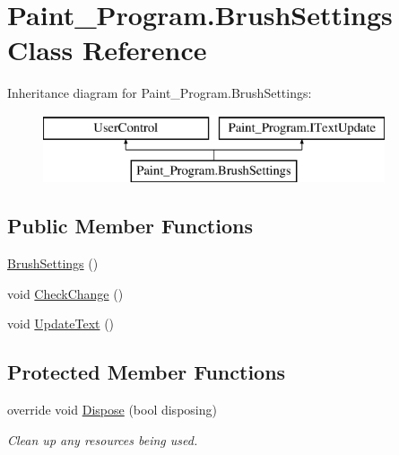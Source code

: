 \hypertarget{class_paint___program_1_1_brush_settings}{}\section{Paint\+\_\+\+Program.\+Brush\+Settings Class Reference}
\label{class_paint___program_1_1_brush_settings}
Inheritance diagram for Paint\+\_\+\+Program.\+Brush\+Settings\+:\begin{figure}[H]
\begin{center}
\leavevmode
\includegraphics[height=2.000000cm]{class_paint___program_1_1_brush_settings}
\end{center}
\end{figure}
\subsection*{Public Member Functions}
\begin{DoxyCompactItemize}
\item 
\mbox{\hyperlink{class_paint___program_1_1_brush_settings_a70080ac2deafd89e2181a30fff984c2d}{Brush\+Settings}} ()
\item 
void \mbox{\hyperlink{class_paint___program_1_1_brush_settings_aca47f3fee40766ced37ffc395b63cde0}{Check\+Change}} ()
\item 
void \mbox{\hyperlink{class_paint___program_1_1_brush_settings_a0669e5f09b62b9545e408f39689f30ed}{Update\+Text}} ()
\end{DoxyCompactItemize}
\subsection*{Protected Member Functions}
\begin{DoxyCompactItemize}
\item 
override void \mbox{\hyperlink{class_paint___program_1_1_brush_settings_a8b0b64c70a489eb664e73de7b3fe9f9c}{Dispose}} (bool disposing)
\begin{DoxyCompactList}\small\item\em Clean up any resources being used. \end{DoxyCompactList}\end{DoxyCompactItemize}
